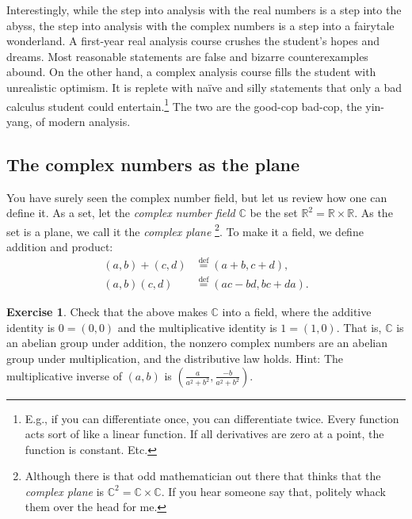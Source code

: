 \documentclass[12pt,openany]{book}
\newcommand{\C}{{\mathbb{C}}}
\newcommand{\R}{{\mathbb{R}}}
\newcommand{\myindex}[1]{#1\index{#1}}
\theoremstyle{plain}
\theoremstyle{remark}
\theoremstyle{definition}
\newenvironment{exbox}{%
    \def\FrameCommand{\vrule width 1pt \relax\hspace {10pt}}%
    \MakeFramed {\advance \hsize -\width \FrameRestore }%
}{%
    \endMakeFramed
}
\theoremstyle{exercise}
\newtheorem{exercise}{Exercise}[section]
\theoremstyle{example}
\begin{document}
Interestingly, while the step into analysis with the real numbers
is a step into the abyss, the step into analysis with the complex numbers is a
step into a fairytale wonderland.  A first-year real analysis course
crushes the student's hopes and dreams.  Most reasonable statements
are false and bizarre counterexamples abound.
On the other hand, a complex analysis course fills the student with
unrealistic optimism.  It is replete with na\"ive and silly statements
that only a bad calculus student could entertain.\footnote{%
E.g., if you can differentiate once, you can differentiate twice.
Every function acts sort of like a linear function.
If all derivatives are zero at a point, the function is constant.
Etc.}
The two are the good-cop bad-cop, the yin-yang,
of modern analysis.



\subsection{The complex numbers as the plane}

You have surely seen the complex number field,
but let us review how one can define it.
As a set, let the \emph{\myindex{complex number field}}
$\C$ be the set $\R^2 = \R \times \R$.
As the set is a plane, we call it the \emph{\myindex{complex plane}}%
\footnote{Although there is that odd mathematician out there that
thinks that the \emph{complex plane} is $\C^2 = \C \times \C$.
If you hear someone say that, politely whack them over the head for me.}.
To make it a field, we define addition and product:
\begin{align*}
(a,b) + (c,d) & \overset{\text{def}}{=} (a+b,c+d) , \\
(a,b) (c,d) & \overset{\text{def}}{=} (ac-bd,bc+da) .
\end{align*}

\begin{exbox}
\begin{exercise}
Check that the above makes $\C$ into a field, where the additive
identity is $0=(0,0)$ and the multiplicative identity is $1=(1,0)$.
That is, $\C$ is an abelian group under addition,
the nonzero complex numbers are an abelian group under multiplication,
and the distributive law holds.  Hint: The multiplicative inverse of $(a,b)$
is $\left(\frac{a}{a^2+b^2},\frac{-b}{a^2+b^2}\right)$.
\end{exercise}
\end{exbox}
\end{document}
